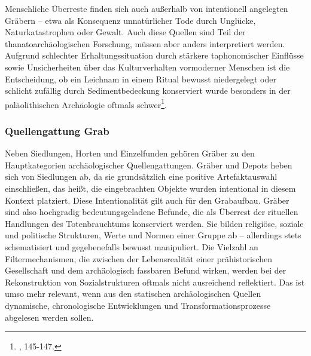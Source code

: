 \documentclass[openany,twoside,twocolumn]{book}
\let\rmarkdownfootnote\footnote%
\def\footnote{\protect\rmarkdownfootnote}
\begin{document}
Menschliche Überreste finden sich auch außerhalb von intentionell
angelegten Gräbern -- etwa als Konsequenz unnatürlicher Tode durch
Unglücke, Naturkatastrophen oder Gewalt. Auch diese Quellen sind Teil
der thanatoarchäologischen Forschung, müssen aber anders interpretiert
werden. Aufgrund schlechter Erhaltungssituation durch stärkere
taphonomischer Einflüsse sowie Unsicherheiten über das Kulturverhalten
vormoderner Menschen ist die Entscheidung, ob ein Leichnam in einem
Ritual bewusst niedergelegt oder schlicht zufällig durch
Sedimentbedeckung konserviert wurde besonders in der paläolithischen
Archäologie oftmals schwer\footnote{\textcite{hofmann_rituelle_2008},
  145-147.}.

\hypertarget{quellengattung-grab}{%
\subsubsection{Quellengattung Grab}\label{quellengattung-grab}}

Neben Siedlungen, Horten und Einzelfunden gehören Gräber zu den
Hauptkategorien archäologischer Quellengattungen. Gräber und Depots
heben sich von Siedlungen ab, da sie grundsätzlich eine positive
Artefaktauswahl einschließen, das heißt, die eingebrachten Objekte
wurden intentional in diesem Kontext platziert. Diese Intentionalität
gilt auch für den Grabaufbau. Gräber sind also hochgradig
bedeutungsgeladene Befunde, die als Überrest der rituellen Handlungen
des Totenbrauchtums konserviert werden. Sie bilden religiöse, soziale
und politische Strukturen, Werte und Normen einer Gruppe ab --
allerdings stets schematisiert und gegebenefalls bewusst manipuliert.
Die Vielzahl an Filtermechanismen, die zwischen der Lebensrealität einer
prähistorischen Gesellschaft und dem archäologisch fassbaren Befund
wirken, werden bei der Rekonstruktion von Sozialstrukturen oftmals nicht
ausreichend reflektiert. Das ist umso mehr relevant, wenn aus den
statischen archäologischen Quellen dynamische, chronologische
Entwicklungen und Transformationsprozesse abgelesen werden sollen.
\end{document}

